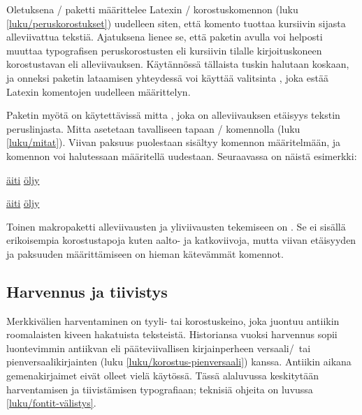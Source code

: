 Oletuksena \-/ paketti määrittelee Latexin
\-/ korostuskomennon (luku \ref{luku/peruskorostukset})
uudelleen siten, että komento tuottaa kursiivin sijasta alleviivattua
tekstiä. Ajatuksena lienee se, että paketin avulla voi helposti muuttaa
typografisen peruskorostusten eli kursiivin tilalle kirjoituskoneen
korostustavan eli alleviivauksen. Käytännössä tällaista tuskin halutaan
koskaan, ja onneksi paketin lataamisen yhteydessä voi käyttää valitsinta
, joka estää Latexin komentojen uudelleen
määrittelyn.

\begin{koodilohkosis}
\usepackage[normalem]{ulem}
\end{koodilohkosis}

Paketin  myötä on käytettävissä mitta ,
joka on alleviivauksen etäisyys tekstin peruslinjasta. Mitta asetetaan
tavalliseen tapaan \-/ komennolla (luku
\ref{luku/mitat}). Viivan paksuus puolestaan sisältyy komennon
 määritelmään, ja komennon voi halutessaan
määritellä uudestaan. Seuraavassa on näistä esimerkki:

\begin{koodilohkosis}
\setlength{\ULdepth}{.2ex}        %
\renewcommand{\ULthickness}{.1ex} %
\uline{äiti} \uline{öljy}
\end{koodilohkosis}

\begin{tulossis}
  \setlength{\ULdepth}{.2ex}
  \renewcommand{\ULthickness}{.1ex}
  \uline{äiti} \uline{öljy}
\end{tulossis}

Toinen makropaketti alleviivausten ja yliviivausten tekemiseen on
. Se ei sisällä erikoisempia korostustapoja
kuten aalto- ja katkoviivoja, mutta viivan etäisyyden ja paksuuden
määrittämiseen on hieman kätevämmät komennot.

\subsection{Harvennus ja tiivistys}
\label{luku/korostus-harvennus}

Merkkivälien harventaminen on tyyli- tai korostuskeino, joka juontuu
antiikin roomalaisten kiveen hakatuista teksteistä. Historiansa vuoksi
harvennus sopii luontevimmin antiikvan eli pääteviivallisen
kirjainperheen versaali\-/\ tai pienversaalikirjainten (luku
\ref{luku/korostus-pienversaali}) kanssa. Antiikin aikana
gemenakirjaimet eivät olleet vielä käytössä. Tässä alaluvussa
keskitytään harventamisen ja tiivistämisen typografiaan; teknisiä
ohjeita on luvussa \ref{luku/fontit-välistys}.

